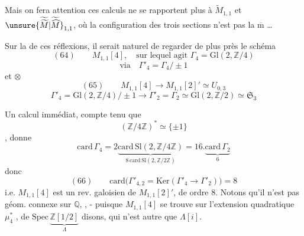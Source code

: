 Mais on fera attention 
ces calculs ne se rapportent plus à $\widetilde M_{1,1}$ et
$\unsure{\widetilde{\widetilde M}|\widetilde{\widehat M}}_{1,1}$,
où la configuration des trois sections
n'est pas la $\overline{\mathrm m}$ \ldots


Sur la  de ces réflexions, il serait naturel de regarder
de plus près le schéma
\[
(64)\qquad
M_{1,1}[4],\quad
\text{sur lequel agit }\Gamma_4=\mathrm{Gl}(2,\mathbb Z/4)
\]
\[
\text{via}\quad \Gamma'_4=\Gamma_4/\pm1
\]
et  $\otimes$
\[
(65)\qquad
M_{1,1}[4]\longrightarrow M_{1,1}[2]'\simeq U_{0,3}
\]
 
\[
\Gamma'_4=\mathrm{Gl}(2,\mathbb Z/4)/\pm1
\longrightarrow
\Gamma'_2=\Gamma_2\simeq\mathrm{Gl}(2,\mathbb Z/2)
\simeq\mathfrak S_3
\]

Un calcul immédiat, compte tenu que
\[
(\mathbb Z/4\mathbb Z)^*\simeq\{\pm1\}
\]
, donne
\[
\mathrm{card}\,\Gamma_4
=
2\underbrace{\mathrm{card}\,\mathrm{Sl}(2,\mathbb Z/4\mathbb Z)}
_{8\,\mathrm{card}\,\mathrm{Sl}(2,\mathbb Z/2\mathbb Z)}
=
16.\underbrace{\mathrm{card}\,\Gamma_2}_{6}
\]
donc
\[
(66)\qquad
\mathrm{card}\bigl(\Gamma'_{4,2}
=\mathrm{Ker}(\Gamma'_4\longrightarrow\Gamma'_2)\bigr)=8
\]
i.e. $M_{1,1}[4]$ est un rev. galoisien de $M_{1,1}[2]'$,
de  ordre $8$.
Notons qu'il n'est pas géom. connexe sur $\mathbb Q$,
,
- puisque $M_{1,1}[4]$ se trouve sur l'extension quadratique
$\mu_4^*$ , de
$\mathrm{Spec}\,\underbrace{\mathbb Z[1/2]}_{\Lambda}$ disons,
qui n'est autre que $\Lambda[i]$.

